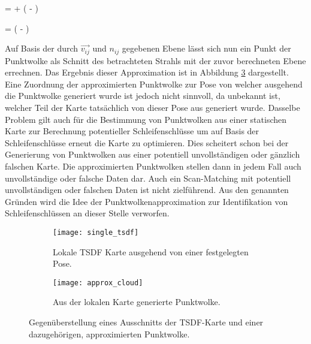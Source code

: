 \begin{myequation}
 =  + \left( - \right) \cdot {}
\end{myequation}

\begin{myequation}
 = \left( - \right)
\end{myequation}

Auf Basis der durch $\vec{v_{ij}}$ und $n_{ij}$ gegebenen Ebene lässt sich nun ein Punkt der Punktwolke als Schnitt des betrachteten Strahls mit der zuvor berechneten Ebene errechnen. Das Ergebnis dieser Approximation ist in Abbildung \ref{fig:pointcloud_approximation} dargestellt. Eine Zuordnung der approximierten Punktwolke zur Pose von welcher ausgehend die Punktwolke generiert wurde ist jedoch nicht sinnvoll, da unbekannt ist, welcher Teil der Karte tatsächlich von dieser Pose aus generiert wurde. Dasselbe Problem gilt auch für die Bestimmung von Punktwolken aus einer statischen Karte zur Berechnung potentieller Schleifenschlüsse um auf Basis der Schleifenschlüsse erneut die Karte zu optimieren. Dies scheitert schon bei der Generierung von Punktwolken aus einer potentiell unvollständigen oder gänzlich falschen Karte. Die approximierten Punktwolken stellen dann in jedem Fall auch unvollständige oder falsche Daten dar. Auch ein Scan-Matching mit potentiell unvollständigen oder falschen Daten ist nicht zielführend. Aus den genannten Gründen wird die Idee der Punktwolkenapproximation zur Identifikation von Schleifenschlüssen an dieser Stelle verworfen.

\begin{figure}
	\centering
	\begin{subfigure}{.5\textwidth}
 		 \centering
  		 \texttt{[image: single\_tsdf]}
  		 \centering \caption{Lokale TSDF Karte ausgehend von einer festgelegten Pose.}
  		 \label{fig:single_tsdf}
	\end{subfigure}%
	\begin{subfigure}{.5\textwidth}
    	\centering
  		\texttt{[image: approx\_cloud]}
  		\centering \caption{Aus der lokalen Karte generierte Punktwolke.}
  		\label{fig:approx_cloud}
	\end{subfigure}
	\caption{Gegenüberstellung eines Ausschnitts der TSDF-Karte und einer dazugehörigen, approximierten Punktwolke.}
	\label{fig:pointcloud_approximation}
\end{figure}

